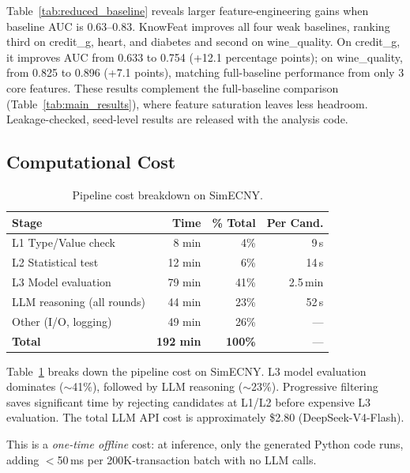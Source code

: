 Table~\ref{tab:reduced_baseline} reveals larger feature-engineering gains when baseline AUC is 0.63--0.83. KnowFeat improves all four weak baselines, ranking third on credit\_g, heart, and diabetes and second on wine\_quality. On credit\_g, it improves AUC from 0.633 to 0.754 (+12.1 percentage points); on wine\_quality, from 0.825 to 0.896 (+7.1 points), matching full-baseline performance from only 3 core features. These results complement the full-baseline comparison (Table~\ref{tab:main_results}), where feature saturation leaves less headroom. Leakage-checked, seed-level results are released with the analysis code.

\subsection{Computational Cost}
\label{subsec:cost}

\begin{table}[t]
\centering
\caption{Pipeline cost breakdown on SimECNY.}
\label{tab:cost}
\small
\renewcommand{\arraystretch}{1.15}
\setlength{\tabcolsep}{2.5pt}
\begin{tabular}{l r r r}
\hline
\textbf{Stage} & \textbf{Time} & \textbf{\% Total} & \textbf{Per Cand.} \\
\hline
L1 Type/Value check        &   8 min &  4\% & 9\,s \\
L2 Statistical test        &  12 min &  6\% & 14\,s \\
L3 Model evaluation        &  79 min & 41\% & 2.5\,min \\
LLM reasoning (all rounds) &  44 min & 23\% & 52\,s \\
Other (I/O, logging)       &  49 min & 26\% & --- \\
\hline
\textbf{Total}             & \textbf{192 min} & \textbf{100\%} & --- \\
\hline
\end{tabular}
\end{table}

Table~\ref{tab:cost} breaks down the pipeline cost on SimECNY. L3 model evaluation dominates ($\sim$41\%), followed by LLM reasoning ($\sim$23\%). Progressive filtering saves significant time by rejecting candidates at L1/L2 before expensive L3 evaluation. The total LLM API cost is approximately \$2.80 (DeepSeek-V4-Flash).

This is a \emph{one-time offline} cost: at inference, only the generated Python code runs, adding $<$50\,ms per 200K-transaction batch with no LLM calls.

